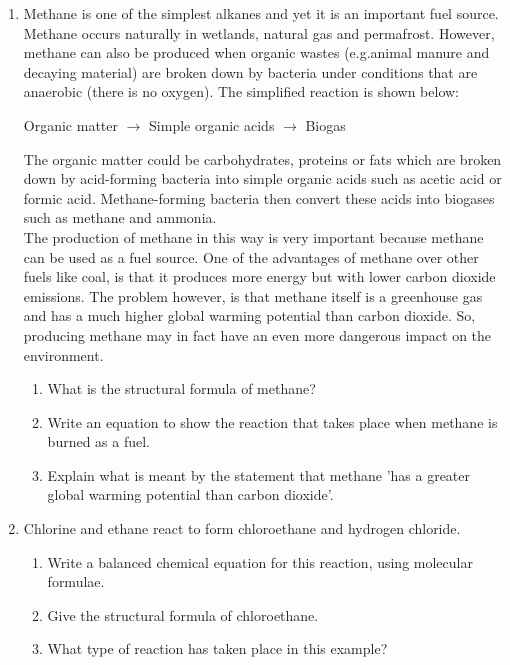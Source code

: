 {\begin{enumerate}
\item{Methane is one of the simplest alkanes and yet it is an important fuel source. Methane occurs naturally in wetlands, natural gas and permafrost. However, methane can also be produced when organic wastes (e.g.\@ animal manure and decaying material) are broken down by bacteria under conditions that are anaerobic (there is no oxygen). The simplified reaction is shown below:

\begin{center}
Organic matter ${\rightarrow}$ Simple organic acids ${\rightarrow}$ Biogas
\end{center}

The organic matter could be carbohydrates, proteins or fats which are broken down by acid-forming bacteria into simple organic acids such as acetic acid or formic acid. Methane-forming bacteria then convert these acids into biogases such as methane and ammonia.\\

The production of methane in this way is very important because methane can be used as a fuel source. One of the advantages of methane over other fuels like coal, is that it produces more energy but with lower carbon dioxide emissions. The problem however, is that methane itself is a greenhouse gas and has a much higher global warming potential than carbon dioxide. So, producing methane may in fact have an even more dangerous impact on the environment.

\begin{enumerate}
\item{What is the structural formula of methane?}
\item{Write an equation to show the reaction that takes place when methane is burned as a fuel.}
\item{Explain what is meant by the statement that methane 'has a greater global warming potential than carbon dioxide'.}
\end{enumerate}
}

\item{Chlorine and ethane react to form chloroethane and hydrogen chloride.}
	\begin{enumerate}
	\item{Write a balanced chemical equation for this reaction, using molecular formulae.}
	\item{Give the structural formula of chloroethane.}
	\item{What type of reaction has taken place in this example?}
	\end{enumerate}


\end{enumerate}}
